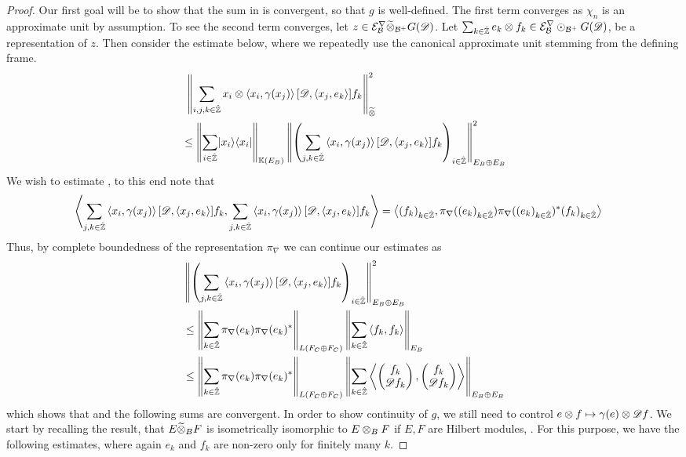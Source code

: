 \begin{proof}
	Our first goal will be to show that the sum in  is convergent, so that $g$ is well-defined. 
	The first term converges as $\chi_n$ is an approximate unit by assumption. To see the second term converges, let $z\in \mathcal{E}^\nabla_{\mathcal{B}}\widetilde{\otimes}_{\mathcal{B}^+} G(\mathscr{D})$.  Let $\sum_{k\in \hat{\mathbb{Z}}} e_k\otimes f_k \in \mathcal{E}^{\nabla}_{\mathcal{B}}\odot_{\mathcal{B}^+}G(\mathscr{D})$, be a representation of $z$. Then consider the estimate below, where we repeatedly use the canonical approximate unit stemming from the defining frame. 
	\begin{align}
		&~\left \Vert \sum_{i,j,k \in \hat{\mathbb{Z}}} x_i\otimes\left \langle x_i,\gamma(x_j) \right \rangle[\mathscr{D},\left \langle x_j,e_k \right \rangle]f_k \right \Vert^2_{\widetilde{\otimes}} \\
		&\leq \left \Vert \sum_{i\in \hat{\mathbb{Z}}} \lvert x_i \rangle\langle x_i \rvert  \right \Vert_{\mathbb{K}(E_B)}\left \Vert \left ( \sum_{j,k\in \hat{\mathbb{Z}}} \left \langle x_i,\gamma(x_j) \right \rangle[\mathscr{D},\left \langle x_j,e_k \right \rangle]f_k \right )_{i\in \hat{\mathbb{Z}}}  \right \Vert_{E_B\oplus E_B}^2 \label{completelyboundedeq}
	\end{align}
	We wish to estimate , to this end note that 
	\begin{align*}
		\left \langle \sum_{j,k\in \hat{\mathbb{Z}}} \left \langle x_i,\gamma(x_j) \right \rangle[\mathscr{D},\left \langle x_j,e_k \right \rangle]f_k,\sum_{j,k\in \hat{\mathbb{Z}}} \left \langle x_i,\gamma(x_j) \right \rangle[\mathscr{D},\left \langle x_j,e_k \right \rangle]f_k \right \rangle&=\left \langle (f_k)_{k\in \hat{\mathbb{Z}}},\pi_{\nabla}((e_k)_{k\in \hat{\mathbb{Z}}})\pi_{\nabla}((e_k)_{k\in \hat{\mathbb{Z}}})^*(f_k)_{k\in \hat{\mathbb{Z}}} \right \rangle
	\end{align*}
	Thus, by complete boundedness of the representation $\pi_\nabla$ we can continue our estimates as
	\begin{align*}
	&\left \Vert \left ( \sum_{j,k\in \hat{\mathbb{Z}}} \left \langle x_i,\gamma(x_j) \right \rangle[\mathscr{D},\left \langle x_j,e_k \right \rangle]f_k \right )_{i\in \hat{\mathbb{Z}}}  \right \Vert_{E_B\oplus E_B}^2 \\
		&\leq \left \Vert \sum_{k\in \hat{\mathbb{Z}}} \pi_{\nabla}(e_k)\pi_\nabla(e_k)^* \right \Vert_{L(F_C\oplus F_C)}\left \Vert \sum_{k\in \hat{\mathbb{Z}} } \left \langle f_k,f_k \right \rangle \right \Vert_{E_B} \\
		&\leq \left \Vert \sum_{k\in \hat{\mathbb{Z}}} \pi_{\nabla}(e_k)\pi_\nabla(e_k)^* \right \Vert_{L(F_C\oplus F_C)}\left \Vert \sum_{k\in \hat{\mathbb{Z}} } \left \langle \begin{pmatrix}f_k \\ \mathscr{D} f_k\end{pmatrix},\begin{pmatrix}f_k \\ \mathscr{D} f_k\end{pmatrix} \right \rangle  \right \Vert_{E_B\oplus E_B}
	\end{align*}
	which shows that  and the following sums are convergent. 
	In order to show continuity of $g$, we still need to control $e\otimes f \mapsto \gamma(e)\otimes \mathscr{D} f$. We start by recalling the result, that $E\widetilde{\otimes}_B F$ is isometrically isomorphic to $E\otimes_B F$ if $E,F$ are Hilbert modules, \cite{blechernew}. For this purpose, we have the following estimates, where again $e_k$ and $f_k$ are non-zero only for finitely many $k$.

\end{proof}
